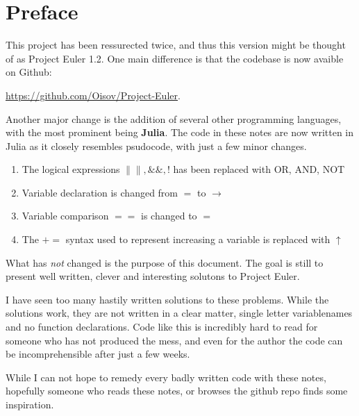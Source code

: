 \section*{Preface}

This project has been ressurected twice, and thus this version might be thought
of as Project Euler 1.2. One main difference is that the codebase is now avaible
on Github:
%
\begin{center}
  \url{https://github.com/Oisov/Project-Euler}.
\end{center}
%
Another major change is the addition of several other programming languages,
with the most prominent being \textbf{Julia}. The code in these notes are now
written in Julia as it closely resembles psudocode, with just a few minor
changes.
%
\begin{enumerate}
    \item The logical expressions $\|\|, \&\&, !$ has been replaced with
          \textsc{OR}, \textsc{AND}, \textsc{NOT}
    \item Variable declaration is changed from $=$ to $\rightarrow$
    \item Variable comparison $==$ is changed to $=$
    \item The $+=$ syntax used to represent increasing a variable is replaced
    with $\uparrow$
\end{enumerate}
%
What has \emph{not} changed is the purpose of this document. The goal is still
to present well written, clever and interesting solutons to Project Euler.

I have seen too many hastily written solutions to these problems. While the
solutions work, they are not written in a clear matter, single letter
variablenames and no function declarations. Code like this is incredibly hard to
read for someone who has not produced the mess, and even for the author the code
can be incomprehensible after just a few weeks.

While I can not hope to remedy every badly written code with these notes,
hopefully someone who reads these notes, or browses the github repo finds some
inspiration. 